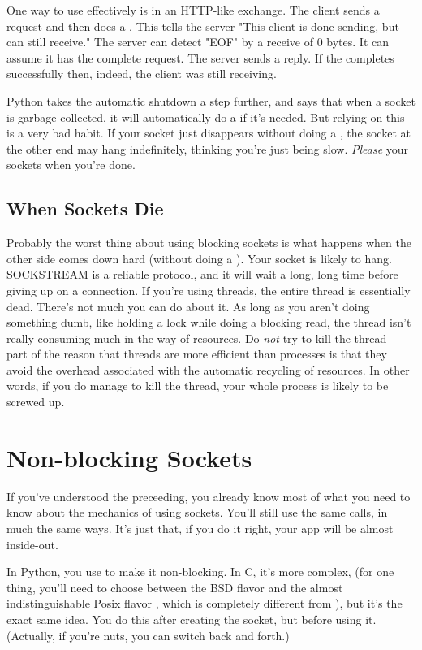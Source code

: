 \documentclass{howto}
\begin{document}
One way to use  effectively is in an HTTP-like
exchange. The client sends a request and then does a
. This tells the server "This client is done
sending, but can still receive."  The server can detect "EOF" by a
receive of 0 bytes. It can assume it has the complete request.  The
server sends a reply. If the  completes successfully
then, indeed, the client was still receiving.

Python takes the automatic shutdown a step further, and says that when a socket is garbage collected, it will automatically do a  if it's needed. But relying on this is a very bad habit. If your socket just disappears without doing a , the socket at the other end may hang indefinitely, thinking you're just being slow. \emph{Please}  your sockets when you're done.


\subsection{When Sockets Die}

Probably the worst thing about using blocking sockets is what happens
when the other side comes down hard (without doing a
). Your socket is likely to hang. SOCKSTREAM is a
reliable protocol, and it will wait a long, long time before giving up
on a connection. If you're using threads, the entire thread is
essentially dead. There's not much you can do about it. As long as you
aren't doing something dumb, like holding a lock while doing a
blocking read, the thread isn't really consuming much in the way of
resources. Do \emph{not} try to kill the thread - part of the reason
that threads are more efficient than processes is that they avoid the
overhead associated with the automatic recycling of resources. In
other words, if you do manage to kill the thread, your whole process
is likely to be screwed up.  

\section{Non-blocking Sockets}

If you've understood the preceeding, you already know most of what you
need to know about the mechanics of using sockets. You'll still use
the same calls, in much the same ways. It's just that, if you do it
right, your app will be almost inside-out.

In Python, you use  to make it
non-blocking. In C, it's more complex, (for one thing, you'll need to
choose between the BSD flavor  and the almost
indistinguishable Posix flavor , which is
completely different from ), but it's the
exact same idea. You do this after creating the socket, but before
using it. (Actually, if you're nuts, you can switch back and forth.)
\end{document}
